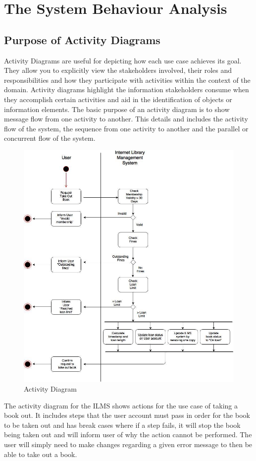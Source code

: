 \section{The System Behaviour Analysis}
\subsection{Purpose of Activity Diagrams}

Activity Diagrams are useful for depicting how each use case achieves its goal. They allow you to explicitly view the stakeholders involved, their roles and responsibilities and how they participate with activities within the context of the domain. Activity diagrams highlight the information stakeholders consume when they accomplish certain activities and aid in the identification of objects or information elements\cite{ibmactivity}. The basic purpose of an activity diagram is to show message flow from one activity to another. This details and includes the activity flow of the system, the sequence from one activity to another and the parallel or concurrent flow of the system\cite{lucidactivity}.

\begin{figure}[H]
    \centering
    \includegraphics[width=0.75\linewidth]{image/activity.jpg}
    \caption{Activity Diagram}
    \label{fig:activity}
\end{figure}

The activity diagram for the ILMS shows actions for the use case of taking a book out. It includes steps that the user account must pass in order for the book to be taken out and has break cases where if a step fails, it will stop the book being taken out and will inform user of why the action cannot be performed. The user will simply need to make changes regarding a given error message to then be able to take out a book. 

